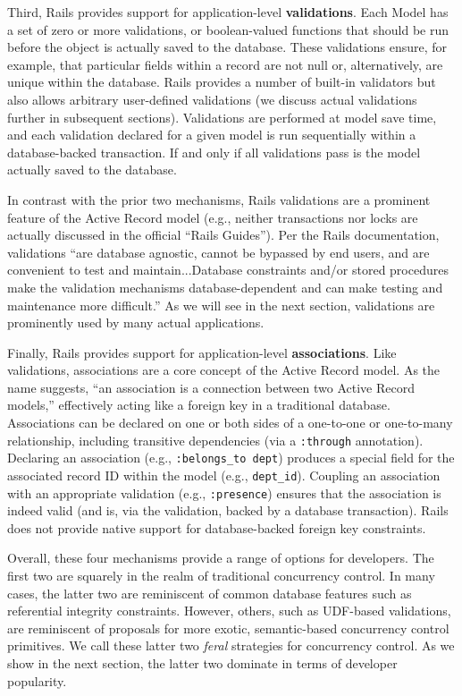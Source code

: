 Third, Rails provides support for application-level
\textbf{validations}. Each Model has a set of zero or more
validations, or boolean-valued functions that should be run before the
object is actually saved to the database. These validations ensure,
for example, that particular fields within a record are not null or,
alternatively, are unique within the database. Rails provides a number
of built-in validators but also allows arbitrary user-defined
validations (we discuss actual validations further in subsequent
sections). Validations are performed at model save time, and each
validation declared for a given model is run sequentially within a
database-backed transaction. If and only if all validations pass is
the model actually saved to the database.

In contrast with the prior two mechanisms, Rails validations are a
prominent feature of the Active Record model (e.g., neither
transactions nor locks are actually discussed in the official ``Rails
Guides''). Per the Rails documentation, validations ``are database
agnostic, cannot be bypassed by end users, and are convenient to test
and maintain...Database constraints and/or stored procedures make the
validation mechanisms database-dependent and can make testing and
maintenance more difficult.'' As we will see in the next section,
validations are prominently used by many actual applications.

Finally, Rails provides support for application-level
\textbf{associations}. Like validations, associations are a core
concept of the Active Record model. As the name suggests, ``an
association is a connection between two Active Record models,''
effectively acting like a foreign key in a traditional
database. Associations can be declared on one or both sides of a
one-to-one or one-to-many relationship, including transitive
dependencies (via a \texttt{:through} annotation). Declaring an
association (e.g., \texttt{:belongs\_to dept}) produces a special field
for the associated record ID within the model (e.g.,
\texttt{dept\_id}). Coupling an association with an appropriate
validation (e.g., \texttt{:presence}) ensures that the association is
indeed valid (and is, via the validation, backed by a database
transaction). Rails does not provide native support for
database-backed foreign key constraints.

Overall, these four mechanisms provide a range of options for
developers. The first two are squarely in the realm of traditional
concurrency control. In many cases, the latter two are reminiscent of
common database features such as referential
integrity constraints. However, others, such as UDF-based validations,
are reminiscent of proposals for more exotic, semantic-based
concurrency control primitives. We call these latter two
\textit{feral} strategies for concurrency control. As we show in the next section, the
latter two dominate in terms of developer popularity.

